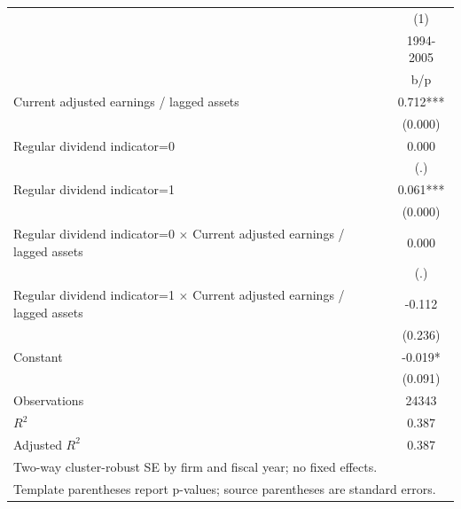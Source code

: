 {
\def\sym#1{\ifmmode^{#1}\else\(^{#1}\)\fi}
\begin{tabular}{l*{1}{c}}
\hline\hline
                    &\multicolumn{1}{c}{(1)}\\
                    &\multicolumn{1}{c}{1994-2005}\\
                    &         b/p   \\
\hline
Current adjusted earnings / lagged assets&       0.712***\\
                    &     (0.000)   \\
Regular dividend indicator=0&       0.000   \\
                    &         (.)   \\
Regular dividend indicator=1&       0.061***\\
                    &     (0.000)   \\
Regular dividend indicator=0 $\times$ Current adjusted earnings / lagged assets&       0.000   \\
                    &         (.)   \\
Regular dividend indicator=1 $\times$ Current adjusted earnings / lagged assets&      -0.112   \\
                    &     (0.236)   \\
Constant            &      -0.019*  \\
                    &     (0.091)   \\
\hline
Observations        &       24343   \\
\(R^{2}\)           &       0.387   \\
Adjusted \(R^{2}\)  &       0.387   \\
\hline\hline
\multicolumn{2}{l}{\footnotesize Two-way cluster-robust SE by firm and fiscal year; no fixed effects.}\\
\multicolumn{2}{l}{\footnotesize Template parentheses report p-values; source parentheses are standard errors.}\\
\end{tabular}
}

